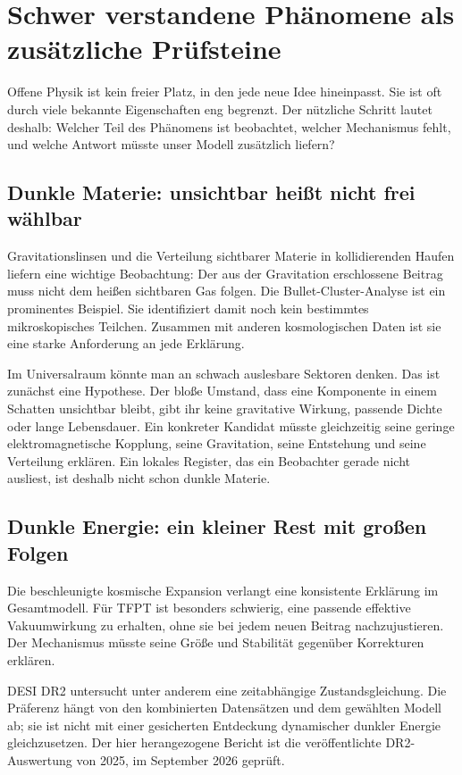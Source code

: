 \chapter{Schwer verstandene Phänomene als zusätzliche Prüfsteine}
\label{ch:shadow-open}
Offene Physik ist kein freier Platz, in den jede neue Idee hineinpasst. Sie ist oft durch viele bekannte Eigenschaften eng begrenzt. Der nützliche Schritt lautet deshalb: Welcher Teil des Phänomens ist beobachtet, welcher Mechanismus fehlt, und welche Antwort müsste unser Modell zusätzlich liefern?

\section{Dunkle Materie: unsichtbar heißt nicht frei wählbar}
Gravitationslinsen und die Verteilung sichtbarer Materie in kollidierenden Haufen liefern eine wichtige Beobachtung: Der aus der Gravitation erschlossene Beitrag muss nicht dem heißen sichtbaren Gas folgen. Die Bullet-Cluster-Analyse ist ein prominentes Beispiel. Sie identifiziert damit noch kein bestimmtes mikroskopisches Teilchen. Zusammen mit anderen kosmologischen Daten ist sie eine starke Anforderung an jede Erklärung. 

Im Universalraum könnte man an schwach auslesbare Sektoren denken. Das ist zunächst eine Hypothese. Der bloße Umstand, dass eine Komponente in einem Schatten unsichtbar bleibt, gibt ihr keine gravitative Wirkung, passende Dichte oder lange Lebensdauer. Ein konkreter Kandidat müsste gleichzeitig seine geringe elektromagnetische Kopplung, seine Gravitation, seine Entstehung und seine Verteilung erklären. Ein lokales Register, das ein Beobachter gerade nicht ausliest, ist deshalb nicht schon dunkle Materie.

\section{Dunkle Energie: ein kleiner Rest mit großen Folgen}
Die beschleunigte kosmische Expansion verlangt eine konsistente Erklärung im Gesamtmodell. Für TFPT ist besonders schwierig, eine passende effektive Vakuumwirkung zu erhalten, ohne sie bei jedem neuen Beitrag nachzujustieren. Der Mechanismus müsste seine Größe und Stabilität gegenüber Korrekturen erklären.

DESI DR2 untersucht unter anderem eine zeitabhängige Zustandsgleichung. Die Präferenz hängt von den kombinierten Datensätzen und dem gewählten Modell ab; sie ist nicht mit einer gesicherten Entdeckung dynamischer dunkler Energie gleichzusetzen. Der hier herangezogene Bericht ist die veröffentlichte DR2-Auswertung von 2025, im September 2026 geprüft. 

